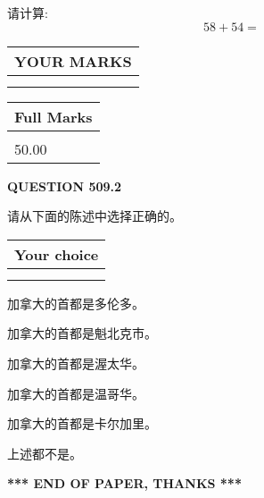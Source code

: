 \documentclass{ctexart}
\begin{document}
  
 
请计算:
\begin{equation}
58 +  %
54 = \nonumber
\end{equation}
 

 

 
  
\vspace{0.2in}
  
\noindent\begin{tabular}{|l|}
\hline
 YOUR MARKS  \\
\hline
 \\ 
 \\ 
\hline
\end{tabular}
\hspace{0.05in} \begin{tabular}{|l|}
\hline
 Full Marks  \\
\hline
 \\ 
50.00 \\
\hline
\end{tabular}
{\textbf{\Large{QUESTION
509.2 
}}}
  
  
请从下面的陈述中选择正确的。
  
  
\noindent\hspace{3.0in} \begin{tabular}{|l|}
\hline
Your choice \\
\hline
 \\ 
 \\ 
\hline
\end{tabular}
  
  
 
 
加拿大的首都是多伦多。
 
 
加拿大的首都是魁北克市。
 
 
加拿大的首都是渥太华。
 
 
加拿大的首都是温哥华。
 
 
加拿大的首都是卡尔加里。
 
 
 上述都不是。
 
 
   
   
 \vspace{0.2in}
 
   
   
   
   
\vspace{1.0in} 
{\textbf{\large{ *** END OF PAPER, THANKS *** }}} 
   
\end{document}
